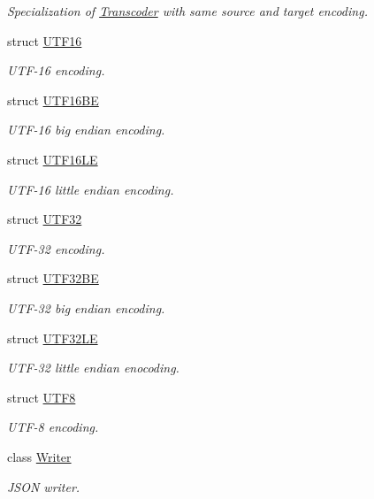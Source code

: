\begin{DoxyCompactItemize}
\begin{DoxyCompactList}\small\item\em Specialization of \mbox{\hyperlink{structrapidjson_1_1_transcoder}{Transcoder}} with same source and target encoding. \end{DoxyCompactList}\item 
struct \mbox{\hyperlink{structrapidjson_1_1_u_t_f16}{U\+T\+F16}}
\begin{DoxyCompactList}\small\item\em U\+T\+F-\/16 encoding. \end{DoxyCompactList}\item 
struct \mbox{\hyperlink{structrapidjson_1_1_u_t_f16_b_e}{U\+T\+F16\+BE}}
\begin{DoxyCompactList}\small\item\em U\+T\+F-\/16 big endian encoding. \end{DoxyCompactList}\item 
struct \mbox{\hyperlink{structrapidjson_1_1_u_t_f16_l_e}{U\+T\+F16\+LE}}
\begin{DoxyCompactList}\small\item\em U\+T\+F-\/16 little endian encoding. \end{DoxyCompactList}\item 
struct \mbox{\hyperlink{structrapidjson_1_1_u_t_f32}{U\+T\+F32}}
\begin{DoxyCompactList}\small\item\em U\+T\+F-\/32 encoding. \end{DoxyCompactList}\item 
struct \mbox{\hyperlink{structrapidjson_1_1_u_t_f32_b_e}{U\+T\+F32\+BE}}
\begin{DoxyCompactList}\small\item\em U\+T\+F-\/32 big endian encoding. \end{DoxyCompactList}\item 
struct \mbox{\hyperlink{structrapidjson_1_1_u_t_f32_l_e}{U\+T\+F32\+LE}}
\begin{DoxyCompactList}\small\item\em U\+T\+F-\/32 little endian enocoding. \end{DoxyCompactList}\item 
struct \mbox{\hyperlink{structrapidjson_1_1_u_t_f8}{U\+T\+F8}}
\begin{DoxyCompactList}\small\item\em U\+T\+F-\/8 encoding. \end{DoxyCompactList}\item 
class \mbox{\hyperlink{classrapidjson_1_1_writer}{Writer}}
\begin{DoxyCompactList}\small\item\em J\+S\+ON writer. \end{DoxyCompactList}\end{DoxyCompactItemize}

